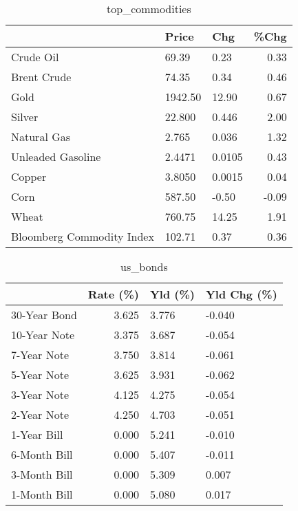 \documentclass{article}%
\begin{document}
\begin{table}[htbp]%
\caption{top\_commodities}%
\centering%
\begin{adjustbox}{width=1\textwidth}%
\begin{tabular}{lllr}
\toprule
                          &   Price &    Chg &  \%Chg \\
\midrule
               Crude Oil  &   69.39 &   0.23 &  0.33 \\
             Brent Crude  &   74.35 &   0.34 &  0.46 \\
                    Gold  & 1942.50 &  12.90 &  0.67 \\
                  Silver  &  22.800 &  0.446 &  2.00 \\
             Natural Gas  &   2.765 &  0.036 &  1.32 \\
       Unleaded Gasoline  &  2.4471 & 0.0105 &  0.43 \\
                  Copper  &  3.8050 & 0.0015 &  0.04 \\
                    Corn  &  587.50 &  -0.50 & -0.09 \\
                   Wheat  &  760.75 &  14.25 &  1.91 \\
Bloomberg Commodity Index &  102.71 &   0.37 &  0.36 \\
\bottomrule
\end{tabular}
%
\end{adjustbox}%
\end{table}

%


\begin{table}[htbp]%
\caption{us\_bonds}%
\centering%
\begin{adjustbox}{width=1\textwidth}%
\begin{tabular}{lrll}
\toprule
             &  Rate (\%) & Yld (\%) & Yld Chg (\%) \\
\midrule
30-Year Bond &     3.625 &   3.776 &      -0.040 \\
10-Year Note &     3.375 &   3.687 &      -0.054 \\
 7-Year Note &     3.750 &   3.814 &      -0.061 \\
 5-Year Note &     3.625 &   3.931 &      -0.062 \\
 3-Year Note &     4.125 &   4.275 &      -0.054 \\
 2-Year Note &     4.250 &   4.703 &      -0.051 \\
 1-Year Bill &     0.000 &   5.241 &      -0.010 \\
6-Month Bill &     0.000 &   5.407 &      -0.011 \\
3-Month Bill &     0.000 &   5.309 &       0.007 \\
1-Month Bill &     0.000 &   5.080 &       0.017 \\
\bottomrule
\end{tabular}
%
\end{adjustbox}%
\end{table}
\end{document}

